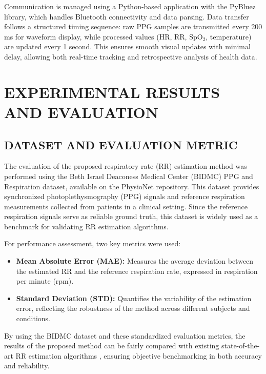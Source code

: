 \documentclass[12pt,a4paper]{report}
\begin{document}
 Communication is managed using a Python-based application with  the PyBluez library, which handles Bluetooth connectivity and data parsing. Data transfer follows a structured timing sequence: raw PPG samples are transmitted every 200 ms for waveform display, while processed values (HR, RR, SpO$_2$, temperature) are updated every 1 second. This ensures smooth visual updates with minimal delay, allowing both real-time tracking and retrospective analysis of health data.


\chapter{\Large EXPERIMENTAL RESULTS AND EVALUATION}

\section{\large{DATASET AND EVALUATION METRIC}}

 The evaluation of the proposed respiratory rate (RR) estimation method was performed using the Beth Israel Deaconess Medical Center (BIDMC) PPG and Respiration dataset, available on the PhysioNet repository\cite{goldberger2000physiobank}. This dataset provides synchronized photoplethysmography (PPG) signals and reference respiration measurements collected from patients in a clinical setting. Since the reference respiration signals serve as reliable ground truth, this dataset is widely used as a benchmark for validating RR estimation algorithms.

 For performance assessment, two key metrics were used:
\begin{itemize}
    \item \textbf{Mean Absolute Error (MAE):} Measures the average deviation between the estimated RR and the reference respiration rate, expressed in respiration per minute (rpm).

    \item \textbf{Standard Deviation (STD):} Quantifies the variability of the estimation error, reflecting the robustness of the method across different subjects and conditions.
\end{itemize}
 By using the BIDMC dataset and these standardized evaluation metrics, the results of the proposed method can be fairly compared with existing state-of-the-art RR estimation algorithms \cite{osathitporn2023rrwavenet}, ensuring objective benchmarking in both accuracy and reliability.
\end{document}
